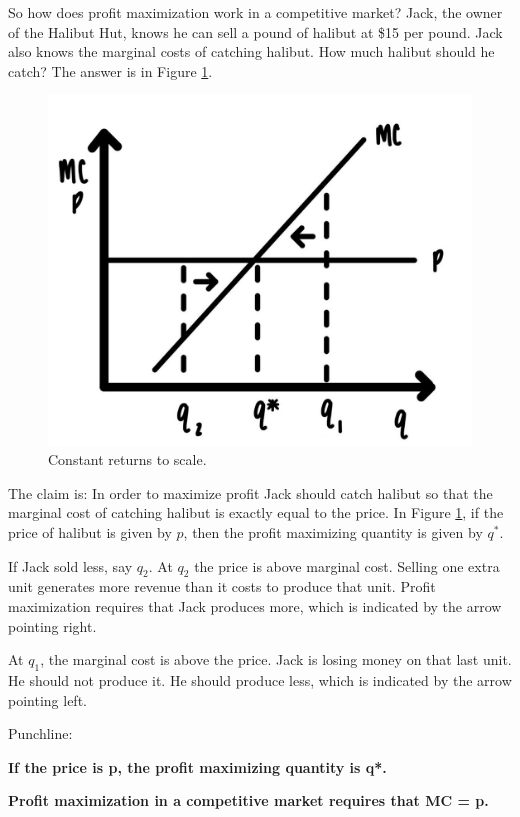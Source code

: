 \documentclass[
]{book}
\begin{document}
So how does profit maximization work in a competitive market? Jack, the owner of the Halibut Hut, knows he can sell a pound of halibut at \$15 per pound. Jack also knows the marginal costs of catching halibut. How much halibut should he catch? The answer is in Figure \ref{fig:supply05}.

\begin{figure}

{\centering \includegraphics[width=0.75\linewidth]{img/supply/fig5} 

}

\caption{Constant returns to scale.}\label{fig:supply05}
\end{figure}

The claim is: In order to maximize profit Jack should catch halibut so that the marginal cost of catching halibut is exactly equal to the price. In Figure \ref{fig:supply05}, if the price of halibut is given by \(p\), then the profit maximizing quantity is given by \(q^*\).

If Jack sold less, say \(q_2\). At \(q_2\) the price is above marginal cost. Selling one extra unit generates more revenue than it costs to produce that unit. Profit maximization requires that Jack produces more, which is indicated by the arrow pointing right.

At \(q_1\), the marginal cost is above the price. Jack is losing money on that last unit. He should not produce it. He should produce less, which is indicated by the arrow pointing left.

Punchline:

\begin{center}

\begin{iucolor}
\textbf{If the price is p, the profit maximizing quantity is q*.}

\textbf{Profit maximization in a competitive market requires that MC = p.}

\end{iucolor}

\end{center}
\end{document}
